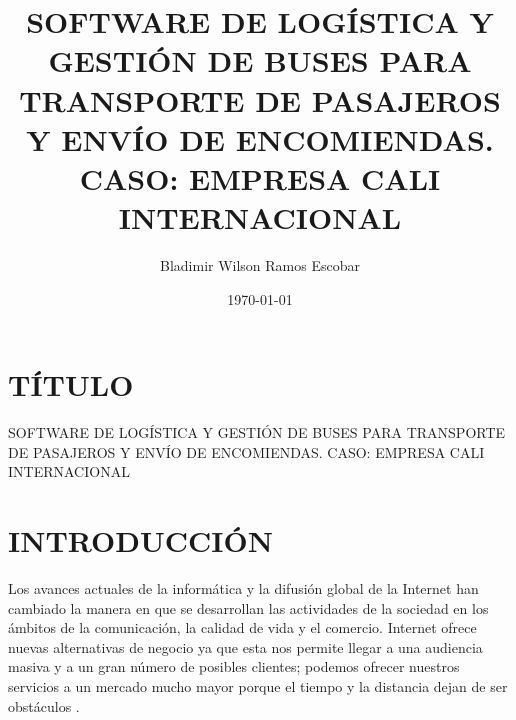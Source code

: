 \documentclass[12pt,letterpaper]{article}
\title{SOFTWARE DE LOGÍSTICA Y GESTIÓN DE BUSES PARA TRANSPORTE DE PASAJEROS Y ENVÍO DE ENCOMIENDAS. CASO: EMPRESA CALI INTERNACIONAL}
\author{Bladimir Wilson Ramos Escobar}
\date{\today}
\begin{document}
	\thispagestyle{empty}
	  
	\thispagestyle{empty}

	\sloppy

\renewcommand{\contentsname}{\hfill\bfseries\normalsize ÍNDICE\hfill}
\tableofcontents
{}
\newpage
\setcounter{page}{1}
\section{TÍTULO}
  SOFTWARE DE LOGÍSTICA Y GESTIÓN DE BUSES PARA TRANSPORTE DE PASAJEROS Y ENVÍO DE ENCOMIENDAS. CASO: EMPRESA CALI INTERNACIONAL
\section{INTRODUCCIÓN}

Los avances actuales de la informática y la difusión global de la Internet han cambiado la manera en que se desarrollan las actividades de la sociedad en los ámbitos de la comunicación, la calidad de vida y el comercio. Internet ofrece nuevas alternativas de negocio ya que esta nos permite llegar a una audiencia masiva y a un gran número de posibles clientes; podemos ofrecer nuestros servicios a un mercado mucho mayor porque el tiempo y la distancia dejan de ser obstáculos \parencite{anormaliza2009implementacion}.

\end{document}
